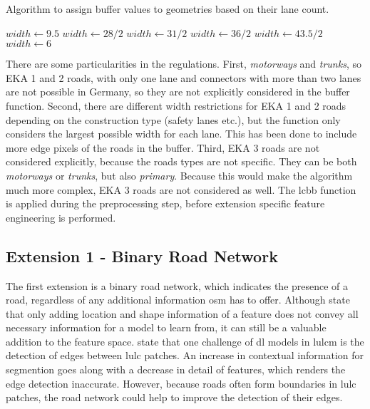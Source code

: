 \begin{algorithm}[htb]
    \caption{Algorithm to assign buffer values to geometries based on their lane count.}
    \begin{algorithmic}
            \State $width \gets 9.5$
            \State $width \gets 28 / 2$
            \State $width \gets 31 / 2$
          
            \State $width \gets 36 / 2$
          
            \State $width \gets 43.5 / 2$
        \Else
            \State $width \gets 6$ 
        \EndIf
    \end{algorithmic}
    \label{alg:lanebased_buffer}
\end{algorithm}

There are some particularities in the regulations. First, \emph{motorways} and \emph{trunks}, so EKA 1 and 2 roads, with only one lane and connectors with more than two lanes are not possible in Germany, so they are not explicitly considered in the buffer function. Second, there are different width restrictions for EKA 1 and 2 roads depending on the construction type (safety lanes etc.), but the function only considers the largest possible width for each lane. This has been done to include more edge pixels of the roads in the buffer. Third, EKA 3 roads are not considered explicitly, because the roads types are not specific. They can be both \emph{motorways} or \emph{trunks}, but also \emph{primary}. Because this would make the algorithm much more complex, EKA 3 roads are not considered as well. The \gls{lcbb} function is applied during the preprocessing step, before extension specific feature engineering is performed.

\subsection{Extension 1 - Binary Road Network}

The first extension is a binary road network, which indicates the presence of a road, regardless of any additional information \gls{osm} has to offer. Although \textcite{Courtial.Touya.ea2022} state that only adding location and shape information of a feature does not convey all necessary information for a model to learn from, it can still be a valuable addition to the feature space. \textcite{Boston.VanDijk.ea2022,Li.Cai.ea2024} state that one challenge of \gls{dl} models in \gls{lulcm} is the detection of edges between \gls{lulc} patches. An increase in contextual information for segmention goes along with a decrease in detail of features, which renders the edge detection inaccurate. However, because roads often form boundaries in \gls{lulc} patches, the road network could help to improve the detection of their edges.

